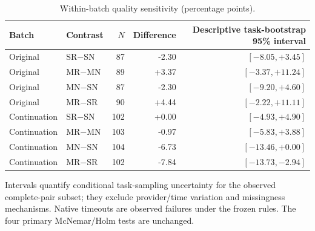 \begin{table}[!htbp]\centering\scriptsize
\caption{Within-batch quality sensitivity (percentage points).}\label{tab:heldout-sensitivity-batch}
\begin{tabular*}{\textwidth}{@{\extracolsep{\fill}}llrrr}\toprule
Batch & Contrast & $N$ & Difference & Descriptive task-bootstrap 95\% interval \\ \midrule
Original & SR$-$SN & 87 & -2.30 & $[-8.05,+3.45]$ \\
Original & MR$-$MN & 89 & +3.37 & $[-3.37,+11.24]$ \\
Original & MN$-$SN & 87 & -2.30 & $[-9.20,+4.60]$ \\
Original & MR$-$SR & 90 & +4.44 & $[-2.22,+11.11]$ \\
Continuation & SR$-$SN & 102 & +0.00 & $[-4.93,+4.90]$ \\
Continuation & MR$-$MN & 103 & -0.97 & $[-5.83,+3.88]$ \\
Continuation & MN$-$SN & 104 & -6.73 & $[-13.46,+0.00]$ \\
Continuation & MR$-$SR & 102 & -7.84 & $[-13.73,-2.94]$ \\
\bottomrule\end{tabular*}\par\smallskip\footnotesize Intervals quantify conditional task-sampling uncertainty for the observed complete-pair subset; they exclude provider/time variation and missingness mechanisms. Native timeouts are observed failures under the frozen rules. The four primary McNemar/Holm tests are unchanged.\end{table}
